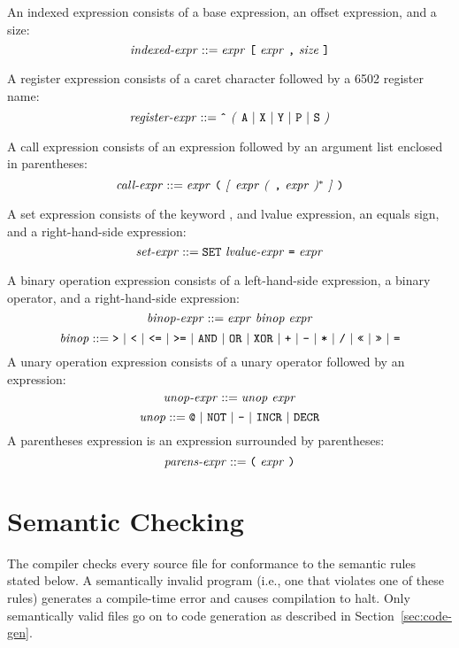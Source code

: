 \documentclass[10pt]{article}
\begin{document}
 An indexed expression consists of a
base expression, an offset expression, and a size:
%
$$\mbox{\textit{indexed-expr}} ::= \mbox{\ensuremath{\mbox{\textit{expr}}} \texttt{[}
    \ensuremath{\mbox{\textit{expr}}} \texttt{,} \ensuremath{\mbox{\textit{size}}} \texttt{]}}$$
%

 A register expression consists of a
caret character followed by a 6502 register name:
%
$$\mbox{\textit{register-expr}} ::= \mbox{\texttt{\^} \textit{(} \texttt{A} $|$
    \texttt{X} $|$ \texttt{Y} $|$ \texttt{P} $|$ \texttt{S} \textit{)}}$$
%

 A call expression consists of an expression
followed by an argument list enclosed in parentheses:
%
$$\mbox{\textit{call-expr}} ::= \mbox{\ensuremath{\mbox{\textit{expr}}} \texttt{(}
  \textit{[} \ensuremath{\mbox{\textit{expr}}} \textit{(} \texttt{,} \ensuremath{\mbox{\textit{expr}}} \textit{)}$^*$ \textit{]} \texttt{)}}$$
%


 A set expression consists of the keyword
, and lvalue expression, an equals sign, and a
right-hand-side expression:
%
$$\mbox{\textit{set-expr}} ::= \mbox{\texttt{SET} \ensuremath{\mbox{\textit{lvalue-expr}}} \texttt{=}
  \ensuremath{\mbox{\textit{expr}}}}$$
%

 A binary operation expression
consists of a left-hand-side expression, a binary operator, and a
right-hand-side expression:
%
$$\mbox{\textit{binop-expr}} ::= \mbox{\ensuremath{\mbox{\textit{expr}}} \ensuremath{\mbox{\textit{binop}}} \ensuremath{\mbox{\textit{expr}}}}$$
%
$$\mbox{\textit{binop}} ::= \mbox{\texttt{>} $|$ \texttt{<} $|$ \texttt{<=} $|$
  \texttt{>=} $|$ \texttt{AND} $|$ \texttt{OR} $|$ \texttt{XOR} $|$ \texttt{+} $|$
  \texttt{-} $|$ \texttt{*} $|$ \texttt{/} $|$ \texttt{<<} $|$ \texttt{>>} $|$
  \texttt{=}}$$
%
 A unary operation expression
consists of a unary operator followed by an expression:
%
$$\mbox{\textit{unop-expr}} ::= \mbox{\ensuremath{\mbox{\textit{unop}}} \ensuremath{\mbox{\textit{expr}}}}$$
%
$$\mbox{\textit{unop}} ::= \mbox{\texttt{@} $|$ \texttt{NOT} $|$ \texttt{-} $|$
  \texttt{INCR} $|$ \texttt{DECR}}$$
%
 A parentheses expression is an
expression surrounded by parentheses:
%
$$\mbox{\textit{parens-expr}} ::= \mbox{\texttt{(} \ensuremath{\mbox{\textit{expr}}} \texttt{)}}$$
%

\section{Semantic Checking}
\label{sec:semantics}

The compiler checks every source file for conformance to the semantic
rules stated below.  A semantically invalid program (i.e., one that
violates one of these rules) generates a compile-time error and causes
compilation to halt.  Only semantically valid files go on to code
generation as described in Section~\ref{sec:code-gen}.
\end{document}
